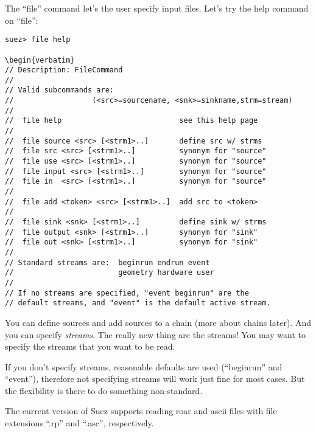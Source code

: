 \documentclass[12pt]{article}
\begin{document}
The ``file'' command let's the user specify input files.
\newline Let's try the help command on ``file'':
%
\begin{verbatim}
suez> file help
 
\begin{verbatim}
// Description: FileCommand                                       
//                                                                
// Valid subcommands are:                                         
//                  (<src>=sourcename, <snk>=sinkname,strm=stream)
//                                                                
//  file help                           see this help page        
//                                                                
//  file source <src> [<strm1>..]       define src w/ strms       
//  file src <src> [<strm1>..]          synonym for "source"    
//  file use <src> [<strm1>..]          synonym for "source"    
//  file input <src> [<strm1>..]        synonym for "source"    
//  file in  <src> [<strm1>..]          synonym for "source"    
//                                                                
//  file add <token> <src> [<strm1>..]  add src to <token>        
//                                                                
//  file sink <snk> [<strm1>..]         define sink w/ strms      
//  file output <snk> [<strm1>..]       synonym for "sink"      
//  file out <snk> [<strm1>..]          synonym for "sink"     
// 
// Standard streams are:  beginrun endrun event              
//                        geometry hardware user             
//                                                           
// If no streams are specified, "event beginrun" are the   
// default streams, and "event" is the default active stream.
\end{verbatim}

You can define sources and add sources to a chain (more about chains
later). And you can specify \emph{streams}.  The really new thing are
the streams! You may want to specify the streams that you want to be read.

If you don't specify streams, reasonable defaults are used (``beginrun''
and ``event''), therefore not specifying streams will work just fine for
most cases. But the flexibility is there to do something non-standard.

The current version of Suez supports reading roar and
ascii files with file extensions ``.rp'' and ``.asc'',
respectively.
\end{document}
